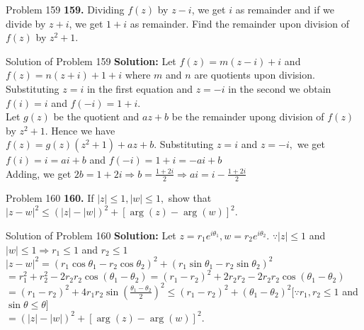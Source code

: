 \documentclass[aspectratio=169,8pt]{beamer}
\begin{document}
\begin{frame}{Problem 159}
  \textbf{159.} Dividing $f(z)$ by $z−i$, we get $i$ as remainder and if we divide by $z+i$, we get $1+i$ as remainder. Find the
  remainder upon division of $f(z)$ by $z^2+1$.
\end{frame}
\begin{frame}{Solution of Problem 159}
  \textbf{Solution:} Let $f(z) = m(z - i) + i$ and $f(z) = n(z + i) + 1 + i$ where $m$ and $n$ are quotients upon division.\\
  \vspace*{0.2cm}
  Substituting $z = i$ in the first equation and $z = -i$ in the second we obtain $f(i) = i$ and $f(-i) = 1 + i$.\\
  \vspace*{0.2cm}
  Let $g(z)$ be the quotient and $az + b$ be the remainder upong division of $f(z)$ by $z^2 + 1.$ Hence we have\\
  \vspace*{0.2cm}
  $f(z) = g(z)(z^2 + 1) + az + b.$ Substituting $z = i$ and $z = -i,$ we get\\
  \vspace*{0.2cm}
  $f(i) = i = ai + b$ and $f(-i) = 1 + i = -ai + b$\\
  \vspace*{0.2cm}
  Adding, we get $2b = 1 + 2i \Rightarrow b = \frac{1 + 2i}{2} \Rightarrow ai = i - \frac{1 + 2i}{2}$
\end{frame}
\begin{frame}{Problem 160}
  \textbf{160.} If $|z|\leq 1, |w|\leq 1,$ show that $|z - w|^2 \leq (|z| - |w|)^2 + [\arg(z) - \arg(w)]^2$.
\end{frame}
\begin{frame}{Solution of Problem 160}
  \textbf{Solution:} Let $z = r_1e^{i\theta_1}, w = r_2e^{i\theta_2}$. $\because |z|\leq 1$ and $|w|\leq 1 \Rightarrow r_1\leq 1$
  and $r_2\leq 1$\\
  \vspace*{0.2cm}
  $|z - w|^2 = (r_1\cos\theta_1 - r_2\cos\theta_2)^2 + (r_1\sin\theta_1 - r_2\sin\theta_2)^2$\\
  \vspace*{0.2cm}
  $= r_1^2 + r_2^2 - 2r_2r_2\cos(\theta_1 - \theta_2) = (r_1 - r_2)^2 + 2r_2r_2 - 2r_2r_2\cos(\theta_1 - \theta_2)$\\
  \vspace*{0.2cm}
  $= (r_1 - r_2)^2 + 4r_1r_2\sin\left(\frac{\theta_1 - \theta_2}{2}\right)^2\leq (r_1 - r_2)^2 + (\theta_1 - \theta_2)^2[\because
    r_1, r_2\leq 1$ and $\sin\theta \leq \theta]$\\
    \vspace*{0.2cm}
    $= (|z| - |w|)^2 + [\arg(z) - \arg(w)]^2$.
\end{frame}
\end{document}
